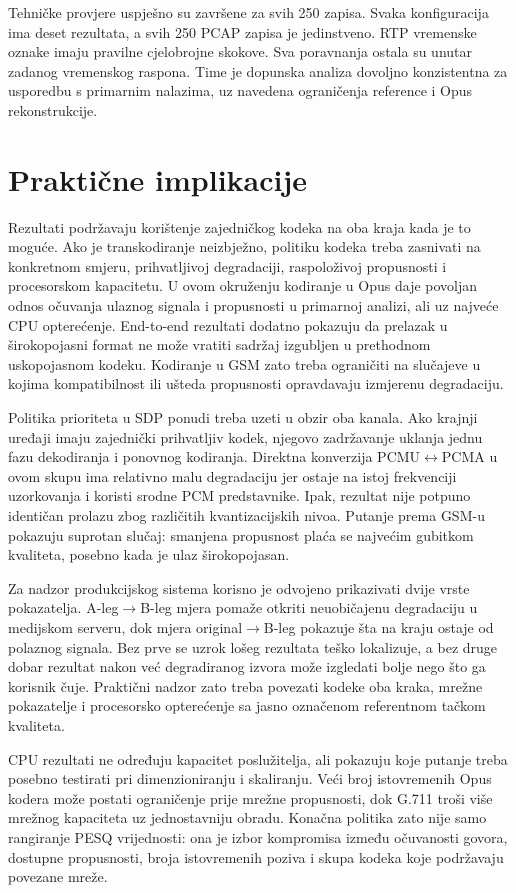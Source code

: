 Tehničke provjere uspješno su završene za svih 250 zapisa. Svaka konfiguracija ima deset rezultata, a svih 250 PCAP zapisa je jedinstveno. RTP vremenske oznake imaju pravilne cjelobrojne skokove. Sva poravnanja ostala su unutar zadanog vremenskog raspona. Time je dopunska analiza dovoljno konzistentna za usporedbu s primarnim nalazima, uz navedena ograničenja reference i Opus rekonstrukcije.

\section{Praktične implikacije}

Rezultati podržavaju korištenje zajedničkog kodeka na oba kraja kada je to moguće. Ako je transkodiranje neizbježno, politiku kodeka treba zasnivati na konkretnom smjeru, prihvatljivoj degradaciji, raspoloživoj propusnosti i procesorskom kapacitetu. U ovom okruženju kodiranje u Opus daje povoljan odnos očuvanja ulaznog signala i propusnosti u primarnoj analizi, ali uz najveće CPU opterećenje. End-to-end rezultati dodatno pokazuju da prelazak u širokopojasni format ne može vratiti sadržaj izgubljen u prethodnom uskopojasnom kodeku. Kodiranje u GSM zato treba ograničiti na slučajeve u kojima kompatibilnost ili ušteda propusnosti opravdavaju izmjerenu degradaciju.

Politika prioriteta u SDP ponudi treba uzeti u obzir oba kanala. Ako krajnji uređaji imaju zajednički prihvatljiv kodek, njegovo zadržavanje uklanja jednu fazu dekodiranja i ponovnog kodiranja. Direktna konverzija PCMU$\leftrightarrow$PCMA u ovom skupu ima relativno malu degradaciju jer ostaje na istoj frekvenciji uzorkovanja i koristi srodne PCM predstavnike. Ipak, rezultat nije potpuno identičan prolazu zbog različitih kvantizacijskih nivoa. Putanje prema GSM-u pokazuju suprotan slučaj: smanjena propusnost plaća se najvećim gubitkom kvaliteta, posebno kada je ulaz širokopojasan.

Za nadzor produkcijskog sistema korisno je odvojeno prikazivati dvije vrste pokazatelja. A-leg$\rightarrow$B-leg mjera pomaže otkriti neuobičajenu degradaciju u medijskom serveru, dok mjera original$\rightarrow$B-leg pokazuje šta na kraju ostaje od polaznog signala. Bez prve se uzrok lošeg rezultata teško lokalizuje, a bez druge dobar rezultat nakon već degradiranog izvora može izgledati bolje nego što ga korisnik čuje. Praktični nadzor zato treba povezati kodeke oba kraka, mrežne pokazatelje i procesorsko opterećenje sa jasno označenom referentnom tačkom kvaliteta.

CPU rezultati ne određuju kapacitet poslužitelja, ali pokazuju koje putanje treba posebno testirati pri dimenzioniranju i skaliranju. Veći broj istovremenih Opus kodera može postati ograničenje prije mrežne propusnosti, dok G.711 troši više mrežnog kapaciteta uz jednostavniju obradu. Konačna politika zato nije samo rangiranje PESQ vrijednosti: ona je izbor kompromisa između očuvanosti govora, dostupne propusnosti, broja istovremenih poziva i skupa kodeka koje podržavaju povezane mreže.
